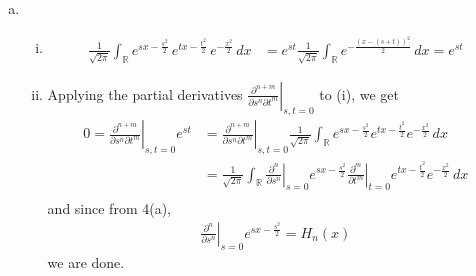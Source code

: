 \documentclass[a4paper,12pt]{article}
\theoremstyle{definition}
\begin{document}
\begin{enumerate}
\begin{enumerate}[(a)]
\item
\begin{enumerate}[(i)]
\item 
\begin{align*}
\frac{1}{\sqrt{2\pi}}\int_{\mathbb{R}}e^{sx-\frac{s^2}{2}}\,e^{tx-\frac{t^2}{2}}\,e^{-\frac{x^2}{2}}\,dx &=e^{st}\frac{1}{\sqrt{2\pi}}\int_{\mathbb{R}}e^{-\frac{(x-(s+t))^2}{2}}\,dx = e^{st}
\end{align*}
\item Applying the partial derivatives $\left.\frac{\partial^{n+m}}{\partial s^n\partial t^m}\right|_{s,t=0}$ to (i), we get
\begin{align*}
0=\left.\frac{\partial^{n+m}}{\partial s^n\partial t^m}\right|_{s,t=0}e^{st} &= \left.\frac{\partial^{n+m}}{\partial s^n\partial t^m}\right|_{s,t=0}\frac{1}{\sqrt{2\pi}}\int_{\mathbb{R}}e^{sx-\frac{s^2}{2}}e^{tx-\frac{t^2}{2}}e^{-\frac{x^2}{2}}\,dx\\&= \frac{1}{\sqrt{2\pi}}\int_{\mathbb{R}}\left.\frac{\partial^{n}}{\partial s^n}\right|_{s=0}e^{sx-\frac{s^2}{2}}\left.\frac{\partial^{m}}{\partial t^m}\right|_{t=0}e^{tx-\frac{t^2}{2}}e^{-\frac{x^2}{2}}\,dx\\
\end{align*}
 and since from 4(a),
\begin{align*}
\left.\frac{\partial^{n}}{\partial s^n}\right|_{s=0}e^{sx-\frac{s^2}{2}}=H_n(x)
\end{align*}
we are done.
\end{enumerate}
\end{enumerate}
\end{enumerate}
\end{document}
